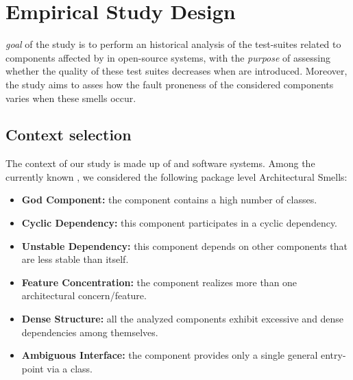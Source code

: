 \section{Empirical Study Design}\label{sec:design}
 \textit{goal} of the study is to perform an historical analysis of the test-suites related to components affected by \asmells in open-source systems, with the \textit{purpose} of assessing whether the quality of these test suites decreases when \asmells are introduced.
Moreover, the study aims to asses how the fault proneness of the considered components varies when these smells occur.


\subsection{Context selection}
The context of our study is made up of \asmells and software systems.
Among the currently known \asmells, we considered the following package level Architectural Smells: %
\begin{itemize}
  \item \textbf{God Component:} the component contains a high number of classes.
  \item \textbf{Cyclic Dependency:} this component participates in a cyclic dependency. 
  \item \textbf{Unstable Dependency:} this component depends on other components that are less stable than itself.
  \item \textbf{Feature Concentration:} the component realizes more than one architectural concern/feature. 
  \item \textbf{Dense Structure:} all the analyzed components exhibit excessive and dense dependencies among themselves. 
  \item \textbf{Ambiguous Interface:} the component provides only a single general entry-point via a class.
\end{itemize}

